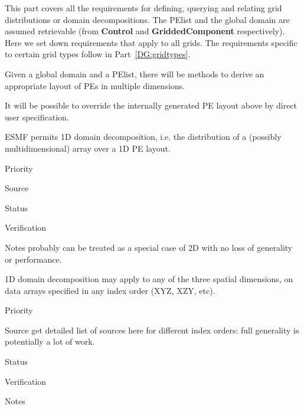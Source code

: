 
This part covers all the requirements for defining, querying and
relating grid distributions or domain decompositions. The PElist and
the global domain are assumed retrievable (from \textbf{Control} and
\textbf{GriddedComponent} respectively). Here we set down requirements
that apply to all grids. The requirements specific to certain grid
types follow in Part~\ref{DG:gridtypes}.



Given a global domain and a PElist, there will be methods to derive an
appropriate layout of PEs in multiple dimensions.


It will be possible to override the internally generated PE layout above
by direct user specification.


ESMF permits 1D domain decomposition, i.e. the distribution of a
(possibly multidimensional) array over a 1D PE layout.

\begin{reqlist}
\item[Priority]
\item[Source]
\item[Status]
\item[Verification]
\item[Notes] probably can be treated as a special case of 2D with no
  loss of generality or performance.
\end{reqlist}


1D domain decomposition may apply to any of the three spatial
dimensions, on data arrays specified in any index order (XYZ, XZY,
etc).

\begin{reqlist}
\item[Priority]
\item[Source] get detailed list of sources here for different index
  orders: full generality is potentially a lot of work.
\item[Status]
\item[Verification]
\item[Notes]
\end{reqlist}


